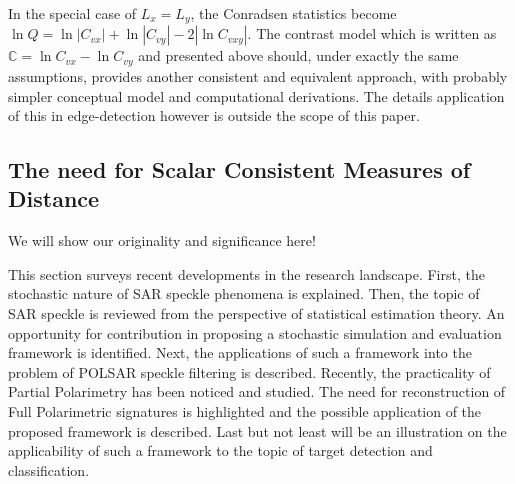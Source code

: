 In the special case of $L_x = L_y$, the Conradsen statistics become
$\ln Q = \ln |C_{vx}| + \ln |C_{vy}| - 2 |\ln C_{vxy}|$.
The contrast model which is written as $\mathbb{C} = \ln C_{vx} - \ln C_{vy}$ and presented above should, under exactly the same assumptions, provides another consistent and equivalent approach,
  with probably simpler conceptual model and computational derivations. 
The details application of this in edge-detection however is outside the scope of this paper.

\subsection{The need for Scalar Consistent Measures of Distance}
	We will show our originality and significance here!

This section surveys recent developments in the research landscape. 
First, the stochastic nature of SAR speckle phenomena is explained. 
Then, the topic of SAR speckle is reviewed from the perspective of statistical estimation theory. 
An opportunity for contribution in proposing a stochastic simulation and evaluation framework is identified. 
Next, the applications of such a framework into the problem of POLSAR speckle filtering is described. 
Recently, the practicality of Partial Polarimetry has been noticed and studied. 
The need for reconstruction of Full Polarimetric signatures is highlighted and the possible application of the proposed framework is described. 
Last but not least will be an illustration on the applicability of such a framework to the topic of target detection and classification.

        


